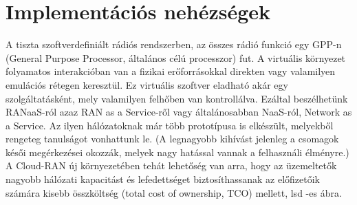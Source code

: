 \section{Implementációs nehézségek}
\hspace{2mm}
\indent A tiszta szoftverdefiniált rádiós rendszerben, az összes rádió funkció egy GPP-n (General Purpose Processor, általános célú processzor) fut. A virtuális környezet folyamatos interakcióban van a fizikai erőforrásokkal direkten vagy valamilyen emulációs rétegen keresztül. Ez virtuális szoftver eladható akár egy szolgáltatásként, mely valamilyen felhőben van kontrollálva. Ezáltal beszélhetünk RANaaS-ról azaz RAN as a Service-ről vagy általánosabban NaaS-ról, Network as a Service. Az ilyen hálózatoknak már több prototípusa is elkészült, melyekből rengeteg tanulságot vonhattunk le. (A legnagyobb kihívást jelenleg a csomagok késői megérkezései okozzák, melyek nagy hatással vannak a felhasználi élményre.)\cite{Architecture}\cite{ImplementationIssues}\cite{ImplementingGPP}
\indent A Cloud-RAN új környezetében tehát lehetőség van arra, hogy az üzemeltetők nagyobb hálózati kapacitást és lefedettséget biztosíthassanak az előfizetőik számára kisebb összköltség (total cost of ownership, TCO) mellett, lsd -es ábra.
